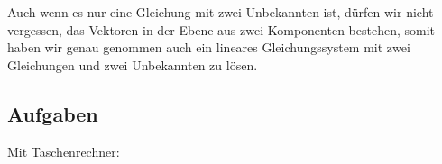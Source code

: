 
\begin{bemerkung}{}{}
  Auch wenn es nur eine Gleichung mit zwei Unbekannten ist, dürfen wir
  nicht vergessen, das Vektoren in der Ebene aus zwei Komponenten
  bestehen, somit haben wir genau genommen auch ein lineares
  Gleichungssystem mit zwei Gleichungen und zwei Unbekannten zu lösen.
  \end{bemerkung}
\newpage
  
\subsection*{Aufgaben}

Mit Taschenrechner:

\newpage
